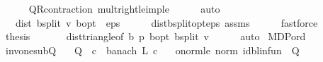 \begin{isabellebody}
\ \ \ \ \isamarkupfalse%
\ QR{\isacharunderscore}{\kern0pt}contraction\ mult{\isacharunderscore}{\kern0pt}right{\isacharunderscore}{\kern0pt}le{\isacharunderscore}{\kern0pt}imp{\isacharunderscore}{\kern0pt}le\isanewline
\ \ \ \ \isamarkupfalse%
\ auto\isanewline
\ \ \isamarkupfalse%
\ \isamarkupfalse%
\ {\isachardoublequoteopen}{}\ {\isacharasterisk}{\kern0pt}\ dist\ {\isacharparenleft}{\kern0pt}{\isasymL}\isactrlsub b{\isacharunderscore}{\kern0pt}split\ v{\isacharparenright}{\kern0pt}\ {\isasymnu}\isactrlsub b{\isacharunderscore}{\kern0pt}opt\ {\isacharless}{\kern0pt}\ eps{\isachardoublequoteclose}\isanewline
\ \ \ \ \isamarkupfalse%
\ dist{\isacharunderscore}{\kern0pt}{\isasymL}\isactrlsub b{\isacharunderscore}{\kern0pt}split{\isacharunderscore}{\kern0pt}opt{\isacharunderscore}{\kern0pt}eps\ assms\isanewline
\ \ \ \ \isamarkupfalse%
\ fastforce\isanewline
\ \ \isamarkupfalse%
\ \isamarkupfalse%
\ {\isacharquery}{\kern0pt}thesis\ \isanewline
\ \ \ \ \isamarkupfalse%
\ dist{\isacharunderscore}{\kern0pt}triangle{\isacharbrackleft}{\kern0pt}of\ {\isachardoublequoteopen}{\isasymnu}\isactrlsub b\ {\isacharquery}{\kern0pt}p{\isachardoublequoteclose}\ {\isasymnu}\isactrlsub b{\isacharunderscore}{\kern0pt}opt\ {\isachardoublequoteopen}{\isasymL}\isactrlsub b{\isacharunderscore}{\kern0pt}split\ v{\isachardoublequoteclose}{\isacharbrackright}{\kern0pt}\isanewline
\ \ \ \ \isamarkupfalse%
\ auto\isanewline
{}\isamarkupfalse%
%
\endisatagproof
{\isafoldproof}%
%
\isadelimproof
\isanewline
%
\endisadelimproof
{}\isamarkupfalse%
\isanewline
\isanewline
{}\isamarkupfalse%
\ MDP{\isacharunderscore}{\kern0pt}ord\ \isanewline
{}\isamarkupfalse%
\ inv{\isacharunderscore}{\kern0pt}one{\isacharunderscore}{\kern0pt}sub{\isacharunderscore}{\kern0pt}Q{\isacharprime}{\kern0pt}{\isacharcolon}{\kern0pt}\isanewline
\ \ \ Q\ {\isacharcolon}{\kern0pt}{\isacharcolon}{\kern0pt}\ {\isachardoublequoteopen}{\isacharprime}{\kern0pt}c\ {\isacharcolon}{\kern0pt}{\isacharcolon}{\kern0pt}\ banach\ {\isasymRightarrow}\isactrlsub L\ {\isacharprime}{\kern0pt}c{\isachardoublequoteclose}\isanewline
\ \ \ onorm{\isacharunderscore}{\kern0pt}le{\isacharcolon}{\kern0pt}\ {\isachardoublequoteopen}norm\ {\isacharparenleft}{\kern0pt}id{\isacharunderscore}{\kern0pt}blinfun\ {\isacharminus}{\kern0pt}\ Q{\isacharparenright}{\kern0pt}\ {\isacharless}{\kern0pt}\ {}{\isachardoublequoteclose}\isanewline

\end{isabellebody}
